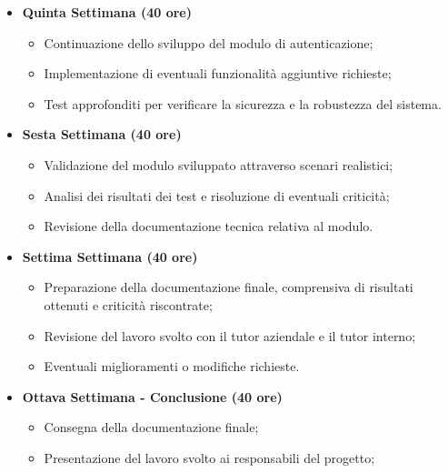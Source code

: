 {\begin{itemize}
\begin{itemize}
        \end{itemize}
        \item \textbf{Quinta Settimana (40 ore)} 
        \begin{itemize}
            \item Continuazione dello sviluppo del modulo di autenticazione;
            \item Implementazione di eventuali funzionalità aggiuntive richieste;
            \item Test approfonditi per verificare la sicurezza e la robustezza del sistema.
        \end{itemize}
        \item \textbf{Sesta Settimana (40 ore)} 
        \begin{itemize}
            \item Validazione del modulo sviluppato attraverso scenari realistici;
            \item Analisi dei risultati dei test e risoluzione di eventuali criticità;
            \item Revisione della documentazione tecnica relativa al modulo.
        \end{itemize}
        \item \textbf{Settima Settimana (40 ore)} 
        \begin{itemize}
            \item Preparazione della documentazione finale, comprensiva di risultati ottenuti e criticità riscontrate;
            \item Revisione del lavoro svolto con il tutor aziendale e il tutor interno;
            \item Eventuali miglioramenti o modifiche richieste.
        \end{itemize}
        \item \textbf{Ottava Settimana - Conclusione (40 ore)} 
        \begin{itemize}
            \item Consegna della documentazione finale;
            \item Presentazione del lavoro svolto ai responsabili del progetto;
        \end{itemize}
    \end{itemize}
}

\newcommand{\totaleOre}{320}

